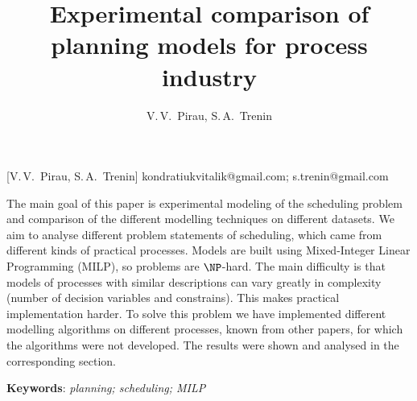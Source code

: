 \documentclass[12pt, twoside]{article}
\theoremstyle{definition}
\begin{document}
\title
    [Experimental comparison of planning models for process industry] %
    {Experimental comparison of planning models for process industry}
\author
    [V.\,V.~Pirau, S.\,A.~Trenin] %
    {V.\,V.~Pirau, S.\,A.~Trenin} %
    [V.\,V.~Pirau, S.\,A.~Trenin] %
\email
    {kondratiukvitalik@gmail.com; s.trenin@gmail.com}

\abstract
{ The main goal of this paper is experimental modeling of the scheduling problem and comparison of the different modelling techniques on different datasets. We aim to analyse different problem statements of scheduling, which came from different kinds of practical processes. Models are built using Mixed-Integer Linear Programming (MILP), so problems are $\NP$-hard. The main difficulty is that models of processes with similar descriptions can vary greatly in complexity (number of decision variables and constrains). This makes practical implementation harder. To solve this problem we have implemented different modelling algorithms on different processes, known from other papers, for which the algorithms were not developed. The results were shown and analysed in the corresponding section. 
	
\bigskip
\noindent
\textbf{Keywords}: \emph {planning; scheduling; MILP}
}



\doi{}
\receivedRus{}
\receivedEng{}


\maketitle
\linenumbers
\end{document}
